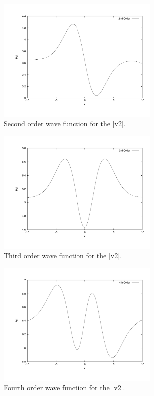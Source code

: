 \documentclass[12pt]{article}
\begin{document}
\begin{figure}[!h]
\centering
\includegraphics[width =110 mm, height = 60mm]{quantum_abs_2.pdf}
\caption{Second order wave function for the \eqref{v2}.}
\label{fig:quant2}
\end{figure}
\begin{figure}[!h]
\centering
\includegraphics[width =110 mm, height = 60mm]{quantum_abs_3.pdf}
\caption{Third order wave function for the \eqref{v2}.}
\label{fig:quant3}
\end{figure}
\begin{figure}[!h]
\centering
\includegraphics[width =110 mm, height = 60mm]{quantum_abs_4.pdf}
\caption{Fourth order wave function for the \eqref{v2}.}
\label{fig:quant4}
\end{figure}
\end{document}
